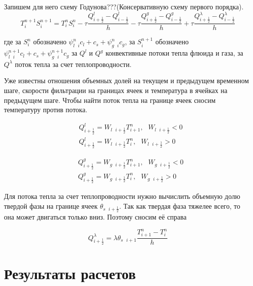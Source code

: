 \documentclass[12pt,a4paper]{article}
\begin{document}
Запишем для него схему Годунова???(Консервативную схему первого порядка).
\begin{equation}
T_i^{n+1} S^{n+1}_i = T_i^n S^{n}_i  - \tau\frac{Q^l_{i+\frac12} - Q^l_{i-\frac12}}{h} -\tau\frac{Q^g_{i+\frac12} - Q^g_{i-\frac12}}{h}  + \tau\frac{Q^{\lambda}_{i+\frac12} - Q^{\lambda}_{i-\frac12}}{h}
\end{equation}

где за $S^n_i$ обозначено $\psi_{l\text{ } i}^n c_l + c_s + \psi_{g\text{ } i}^n c_g$, за $S^{n+1}_i$ обозначено $\psi_{l\text{ } i}^{n+1} c_l + c_s + \psi_{g\text{ } i}^{n+1} c_g$ за $Q^l$ и $Q^g$ конвективные потоки тепла флюида и газа, за $Q^{\lambda}$ поток тепла за счет теплопроводности. 

Уже известны отношения объемных долей на текущем и предыдущем временном шаге, скорости фильтрации на границах ячеек и температура в ячейках на предыдущем шаге. Чтобы найти поток тепла на границе ячеек сносим температуру против потока.

\begin{equation}
\begin{aligned}
&Q^l_{i+\frac12} = W_{l\text{ } i+\frac12} T_{i+1}^n,\text{  } W_{l\text{ } i+\frac12} <0\\
&Q^l_{i+\frac12} = W_{l\text{ } i+\frac12} T_{i}^n,\text{  } W_{l\text{ } i+\frac12} >0
\end{aligned}
\end{equation} 

\begin{equation}
\begin{aligned}
&Q^g_{i+\frac12} = W_{g\text{ } i+\frac12} T_{i+1}^n,\text{  } W_{g\text{ } i+\frac12} <0\\
&Q^g_{i+\frac12} = W_{g\text{ } i+\frac12} T_{i}^n,\text{  } W_{g\text{ } i+\frac12} >0
\end{aligned}
\end{equation} 

Для потока тепла за счет теплопроводности нужно вычислить объемную долю твердой фазы на границе ячеек $\theta_{s\text{ } i+\frac12}$. Так как твердая фаза тяжелее всего, то она может двигаться только вниз. Поэтому сносим её справа

\begin{equation}
Q^{\lambda}_{i+\frac12} =  \lambda \theta_{s\text{ } i +1} \frac{T_{i+1}^n - T_i^n}{h} 
\end{equation}

\section{Результаты расчетов}
\end{document}
